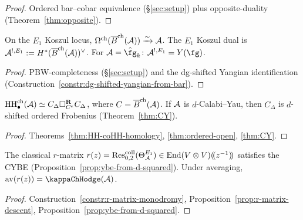 \begin{proof}
Ordered bar--cobar equivalence (\S\ref{sec:setup}) plus
opposite-duality (Theorem~\ref{thm:opposite}).
\end{proof}

\begin{theorem}
On the $E_1$ Koszul locus,
$\Omega^{\mathrm{ch}}(\overline{B}^{\mathrm{ch}}(\mathcal{A})) \xrightarrow{\sim} \mathcal{A}$.
The $E_1$ Koszul dual is
$\mathcal{A}^{!,E_1} := H^*(\overline{B}^{\mathrm{ch}}(\mathcal{A}))^\vee$.
For $\cA = \hat\fg_k$:
$\cA^{!,E_1} = Y(\fg)$.
\end{theorem}

\begin{proof}
PBW-completeness (\S\ref{sec:setup}) and the dg-shifted Yangian
identification
(Construction~\ref{constr:dg-shifted-yangian-from-bar}).
\end{proof}

\begin{theorem}
$\operatorname{HH}^{\mathrm{ch}}_\bullet(\mathcal{A})
\simeq
C_\Delta \square_{C^e}^{\mathbf{R}} C_\Delta$,
where $C = \overline{B}^{\mathrm{ch}}(\mathcal{A})$.
If $\mathcal{A}$ is $d$-Calabi--Yau, then $C_\Delta$ is
$d$-shifted ordered Frobenius
\textup{(}Theorem~\textup{\ref{thm:CY}}).
\end{theorem}

\begin{proof}
Theorems~\ref{thm:HH-coHH-homology}, \ref{thm:ordered-open},
\ref{thm:CY}.
\end{proof}

\begin{theorem}
The classical $r$-matrix
$r(z) = \operatorname{Res}^{\mathrm{coll}}_{0,2}(\Theta_{\mathcal{A}}^{E_1})
\in \operatorname{End}(V \otimes V)(\!(z^{-1})\!)$
satisfies the CYBE
\textup{(}Proposition~\textup{\ref{prop:ybe-from-d-squared}}).
Under averaging,
$\operatorname{av}(r(z)) = \kappaChHodge(\cA)$.
\end{theorem}

\begin{proof}
Construction~\ref{constr:r-matrix-monodromy},
Proposition~\ref{prop:r-matrix-descent},
Proposition~\ref{prop:ybe-from-d-squared}.
\end{proof}

